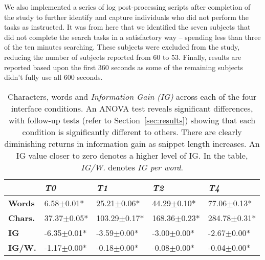 We also implemented a series of log post-processing scripts after completion of the study to further identify and capture individuals who did not perform the tasks as instructed. It was from here that we identified the seven subjects that did not complete the search tasks in a satisfactory way -- spending less than three of the ten minutes searching. These subjects were excluded from the study, reducing the number of subjects reported from 60 to 53. Finally, results are reported based upon the first 360 seconds as some of the remaining subjects didn't fully use all 600 seconds.

\begin{table}[t]
    \caption{Characters, words and \emph{Information Gain (IG)} across each of the four interface conditions. An ANOVA test reveals significant differences, with follow-up tests (refer to Section~\ref{sec:results}) showing that each condition is significantly different to others. There are clearly diminishing returns in information gain as snippet length increases. An IG value closer to zero denotes a higher level of IG. In the table, \emph{IG/W.} denotes \emph{IG per word}.\vspace{-3mm}}
    \label{tbl_info_gain}
    \renewcommand{\arraystretch}{1.4}
    \begin{center}
    \begin{tabulary}{\textwidth}{L{0.758cm}||D{1.45cm}|D{1.45cm}|D{1.45cm}|D{1.45cm}}
    \hline
    & \textbf{\emph{T0}} & \textbf{\emph{T1}} & \textbf{\emph{T2}} & \textbf{\emph{T4}}  \\ \hline\hline
	\hspace*{-0.1cm}\textbf{Words} & 6.58$\pm$0.01* & 25.21$\pm$0.06* & 44.29$\pm$0.10* & 77.06$\pm$0.13* \\ \hline
	\hspace*{-0.1cm}\textbf{Chars.} & 37.37$\pm$0.05* & \hspace*{-0.05cm}103.29$\pm$0.17* & \hspace*{-0.05cm}168.36$\pm$0.23* & \hspace*{-0.05cm}284.78$\pm$0.31* \\ \hline\hline
	\hspace*{-0.1cm}\textbf{IG} & -6.35$\pm$0.01* & \hspace*{-0.05cm}-3.59$\pm$0.00* & \hspace*{-0.05cm}-3.00$\pm$0.00* & \hspace*{-0.05cm}-2.67$\pm$0.00* \\ \hline
	\hspace*{-0.1cm}\textbf{IG/W.} & -1.17$\pm$0.00* & \hspace*{-0.05cm}-0.18$\pm$0.00* & \hspace*{-0.05cm}-0.08$\pm$0.00* & \hspace*{-0.05cm}-0.04$\pm$0.00* \\ \hline
\end{tabulary}
\end{center}
\end{table}

